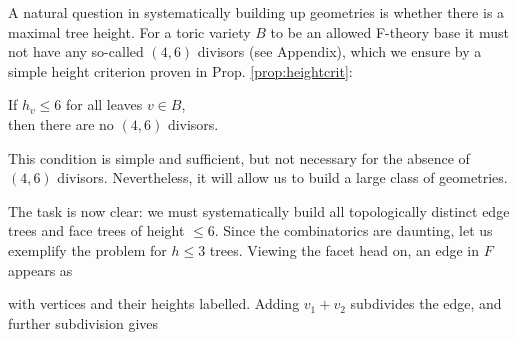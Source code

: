 \documentclass[aps,prl,twocolumn, superscriptaddress,groupedaddress,nofootinbib]{revtex4-1}
\begin{document}
A natural question
in systematically building up geometries is whether there is
a maximal tree height. For a toric variety $B$ to be an allowed
F-theory base it must not have any so-called $(4,6)$ divisors (see Appendix), which
we ensure by a simple height criterion proven in Prop. \ref{prop:heightcrit}:
\begin{center}
If $h_v\leq 6$ for all leaves $v\in B$, \\ then there are no $(4,6)$
divisors.
\end{center}
This condition is simple and sufficient, but not necessary
for the absence of $(4,6)$ divisors. Nevertheless, it
will allow us to build a large class of geometries.


\vspace{.5cm}
The task is now clear: we must systematically build  all
topologically distinct edge trees and face trees of height 
$\leq 6$. Since the combinatorics are daunting, let us
exemplify the problem for $h\leq 3$ trees. Viewing the
facet head on, an edge in $F$ appears as 
\begin{center}
\end{center}
with vertices and their heights labelled.
Adding $v_1+v_2$ subdivides the
edge, and further subdivision gives
\end{document}
